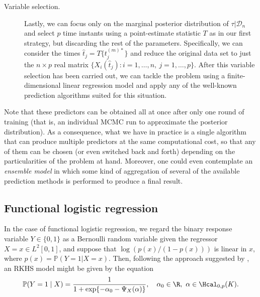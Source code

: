 \begin{description}
  \item[Variable selection.] Lastly, we can focus only on the marginal posterior distribution of \(\tau|\mathcal D_n\) and select \(p\) time instants using a point-estimate statistic \(T\) as in our first strategy, but discarding the rest of the parameters. Specifically, we can consider the times \(\hat t_j = T\{t_j^{(m)*}\}\) and reduce the original data set to just the \(n\times p\) real matrix \(\{X_i(\hat t_j): i=1, \dots,n, \ j=1,\dots,p\}\). After this variable selection has been carried out, we can tackle the problem using a finite-dimensional linear regression model and apply any of the well-known prediction algorithms suited for this situation.
\end{description}

Note that these predictors can be obtained all at once after only one round of training (that is, an individual MCMC run to approximate the posterior distribution). As a consequence, what we have in practice is a single algorithm that can produce multiple predictors at the same computational cost, so that any of them can be chosen (or even switched back and forth) depending on the particularities of the problem at hand. Moreover, one could even contemplate an \textit{ensemble model} in which some kind of aggregation of several of the available prediction methods is performed to produce a final result.

\subsection{Functional logistic regression}\label{sec:rkhs-logistic-model}

In the case of functional logistic regression, we regard the binary response variable \(Y\in\{0, 1\}\) as a Bernoulli random variable given the regressor \(X=x \in L^2[0, 1]\), and suppose that \(\log\left(p(x)/(1-p(x))\right)\) is linear in \(x\), where \(p(x)=\mathbb P(Y=1| X=x)\). Then, following the approach  suggested by \citet{berrendero2018functional}, an RKHS model might be given  by the  equation
\begin{equation}\label{eq:rkhs-model-logistic}
  \mathbb P(Y=1 \mid X) = \frac{1}{1 + \exp\{-\alpha_0 - \Psi_X(\alpha)\}}, \quad \alpha_0 \in \R, \ \alpha \in \Hcal_{0,p}(K).
\end{equation}

